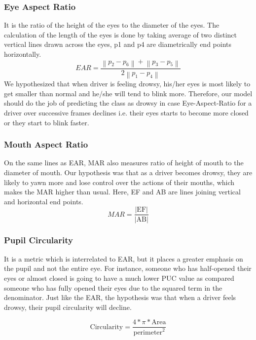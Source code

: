 \documentclass{article}
\begin{document}
\subsubsection{Eye Aspect Ratio}
 It is the ratio of the height of the eyes to the diameter of the eyes. The calculation of the length of the eyes is done by taking average of two distinct vertical lines drawn across the eyes, p1 and p4 are diametrically end points horizontally.
\begin{equation}
    \label{eq-add}
    {EAR}=\frac{\left\|p_{2}-p_{6}\right\|+\left\|p_{3}-p_{5}\right\|}{2\left\|p_{1}-p_{4}\right\|}
\end{equation}
\bigskip
We hypothesized that when driver is feeling drowsy, his/her eyes is most likely to get smaller than normal and he/she will tend to blink more. Therefore, our model should do the job of predicting the class as drowsy in case Eye-Aspect-Ratio for a driver over successive frames declines i.e. their eyes starts to become more closed or they start to blink faster.

\subsubsection{Mouth Aspect Ratio}
On the same lines as EAR, MAR also measures ratio of height of mouth to the diameter of mouth. Our hypothesis was that as a driver becomes drowsy, they are likely to yawn more and lose control over the actions of their mouths, which makes the MAR higher than usual. Here, EF and AB are lines joining vertical and horizontal end points.
\begin{equation}
    \label{eq-add}
    {MAR}=\frac{|\mathrm{EF}|}{|\mathrm{AB}|}
\end{equation}

\subsubsection{Pupil Circularity}
It is a metric which is interrelated to EAR, but it places a greater emphasis on the pupil and not the entire eye. For instance, someone who has half-opened their eyes or almost closed is going to have a much lower PUC value as compared someone who has fully opened their eyes due to the squared term in the denominator. Just like the EAR, the hypothesis was that when a driver feels drowsy, their pupil circularity will decline.

\begin{equation}
    \label{eq-add}
    \mathrm{Circularity} =\frac{4 * \pi * \mathrm { Area}}{\mathrm {perimeter}^{2}}
\end{equation}
\end{document}
